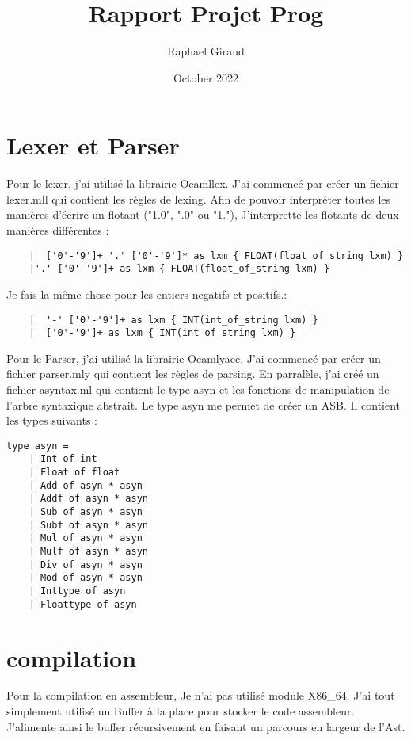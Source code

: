 \documentclass{article}
\title{Rapport Projet Prog}
\author{Raphael Giraud}
\date{October 2022}
\begin{document}
\maketitle

\section{Lexer et Parser}
Pour le lexer, j'ai utilisé la librairie Ocamllex. J'ai commencé par créer un fichier lexer.mll qui contient les règles de lexing.
Afin de pouvoir interpréter toutes les manières d'écrire un flotant ("1.0", ".0" ou "1."), J'interprette les flotants de deux manières différentes :
\begin{lstlisting}
    |  ['0'-'9']+ '.' ['0'-'9']* as lxm { FLOAT(float_of_string lxm) }
    |'.' ['0'-'9']+ as lxm { FLOAT(float_of_string lxm) }
\end{lstlisting}
Je fais la même chose pour les entiers negatifs et positifs.:
\begin{lstlisting}
    |  '-' ['0'-'9']+ as lxm { INT(int_of_string lxm) }
    |  ['0'-'9']+ as lxm { INT(int_of_string lxm) }
\end{lstlisting}
Pour le Parser, j'ai utilisé la librairie Ocamlyacc. J'ai commencé par créer un fichier parser.mly qui contient les règles de parsing.
En parralèle, j'ai créé un fichier asyntax.ml qui contient le type asyn et les fonctions de manipulation de l'arbre syntaxique abstrait. Le type asyn me permet de créer un ASB. Il contient les types suivants :
\begin{lstlisting}
type asyn =
    | Int of int
    | Float of float
    | Add of asyn * asyn
    | Addf of asyn * asyn
    | Sub of asyn * asyn
    | Subf of asyn * asyn
    | Mul of asyn * asyn
    | Mulf of asyn * asyn
    | Div of asyn * asyn
    | Mod of asyn * asyn
    | Inttype of asyn
    | Floattype of asyn
\end{lstlisting}
\section{compilation}
Pour la compilation en assembleur, Je n'ai pas utilisé module X86\_64. J'ai tout simplement utilisé un Buffer à la place pour stocker le code assembleur.
J'alimente ainsi le buffer récursivement en faisant un parcours en largeur de l'Ast.
\end{document}
